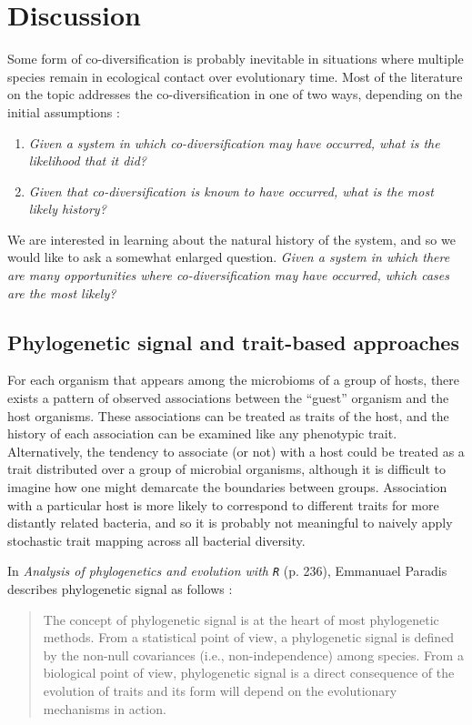 \section{Discussion}

Some form of co-diversification is probably inevitable in situations where multiple species remain in ecological contact over evolutionary time. Most of the literature on the topic addresses the co-diversification in one of two ways, depending on the initial assumptions :

\begin{enumerate}
	\item {\em Given a system in which co-diversification may have occurred, what is the likelihood that it did?}

	\item {\em Given that co-diversification is known to have occurred, what is the most likely history?}
\end{enumerate}

We are interested in learning about the natural history of the system, and so we would like to ask a somewhat enlarged question. {\em Given a system in which there are many opportunities where co-diversification may have occurred, which cases are the most likely?} 

\subsection{Phylogenetic signal and trait-based approaches}

For each organism that appears among the microbioms of a group of hosts, there exists a pattern of observed associations between the ``guest'' organism and the host organisms. These associations can be treated as traits of the host, and the history of each association can be examined like any phenotypic trait. Alternatively, the tendency to associate (or not) with a host could be treated as a trait distributed over a group of microbial organisms, although it is difficult to imagine how one might demarcate the boundaries between groups. Association with a particular host is more likely to correspond to different traits for more distantly related bacteria, and so it is probably not meaningful to naively apply stochastic trait mapping across all bacterial diversity.

In {\em Analysis of phylogenetics and evolution with {\tt R}} (p. 236), Emmanuael Paradis describes phylogenetic signal as follows :

\begin{quote}
The concept of phylogenetic signal is at the heart of most phylogenetic methods. From a statistical point of view, a phylogenetic signal is defined by the non-null covariances (i.e., non-independence) among species. From a biological point of view, phylogenetic signal is a direct consequence of the evolution of traits and its form will depend on the evolutionary mechanisms in action.
\end{quote}

